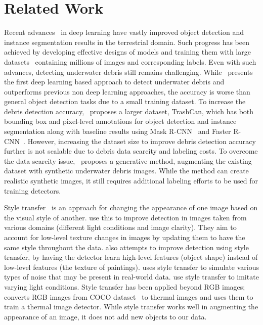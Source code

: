 \section{Related Work}
\label{sec:related}

Recent advances~\cite{lecun2015deep, zaidi2022survey} in deep learning have vastly improved object detection and instance segmentation results in the terrestrial domain. 
Such progress has been achieved by developing effective designs of models and training them with large datasets~\cite{lin2014microsoft, russakovsky2015imagenet} containing millions of images and corresponding labels. 
Even with such advances, detecting underwater debris still remains challenging. 
While~\cite{fulton2019robotic} presents the first deep learning based approach to detect underwater debris and outperforms previous non deep learning approaches, the accuracy is worse than general object detection tasks due to a small training dataset. 
To increase the debris detection accuracy,~\cite{hong2020trashcan} proposes a larger dataset, TrashCan, which has both bounding box and pixel-level annotations for object detection and instance segmentation along with baseline results using Mask R-CNN~\cite{he2017mask} and Faster R-CNN~\cite{ren2015faster}. 
However, increasing the dataset size to improve debris detection accuracy further is not scalable due to debris data scarcity and labeling costs. 
To overcome the data scarcity issue,~\cite{hong_generative_2020} proposes a generative method, augmenting the existing dataset with synthetic underwater debris images. 
While the method can create realistic synthetic images, it still requires additional labeling efforts to be used for training detectors. 

Style transfer~\cite{singh_neural_2021,jing_neural_2020} is an approach for changing the appearance of one image based on the visual style of another. 
\cite{rodriguez_domain_2019, yu_sc-uda_2022} use this to improve detection in images taken from various domains (\eg different light conditions and image clarity). 
They aim to account for low-level texture changes in images by updating them to have the same style throughout the data. 
\cite{kadish_improving_2021} also attempts to improve detection using style transfer, by having the detector learn high-level features (\eg object shape) instead of low-level features (\eg the texture of paintings). 
\cite{amirkhani_enhancing_2021} uses style transfer to simulate various types of noise that may be present in real-world data. 
\cite{lin_gan-based_2021,liu_lane_2020} use style transfer to imitate varying light conditions. 
Style transfer has been applied beyond RGB images; \eg\cite{cygert_style_2019} converts RGB images from COCO dataset~\cite{lin2014microsoft} to thermal images and uses them to train a thermal image detector. 
While style transfer works well in augmenting the appearance of an image, it does not add new objects to our data.


